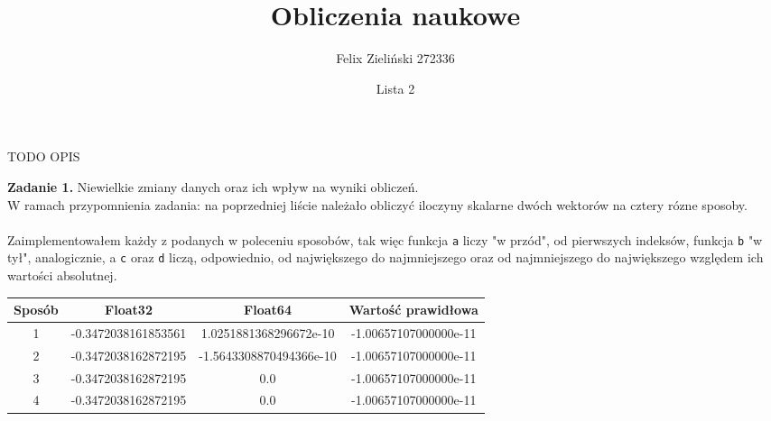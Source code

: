 \documentclass[15pt, a4paper]{article}
\title{Obliczenia naukowe}
\author{Felix Zieliński 272336}
\date{Lista 2}
\begin{document}
\maketitle
TODO OPIS

\vspace{0.5cm}

\noindent\hrulefill


\vspace{0.5cm}

\noindent\textbf{Zadanie 1.} Niewielkie zmiany danych oraz ich wpływ na wyniki obliczeń.\\

\noindent W ramach przypomnienia zadania: na poprzedniej liście  należało obliczyć iloczyny skalarne dwóch wektorów na cztery rózne sposoby.\\\\
Zaimplementowałem każdy z podanych w poleceniu sposobów, tak więc funkcja \verb|a| liczy "w przód", od pierwszych indeksów, funkcja \verb|b| "w tył", analogicznie, a \verb|c| oraz \verb|d| liczą, odpowiednio, od największego do najmniejszego oraz od najmniejszego do największego względem ich wartości absolutnej.

\begin{table}[ht]
    \begin{adjustbox}{max width=\textwidth}
    \begin{tabular}{|c|c|c|c|}
        \hline 
        Sposób & Float32 & Float64 & Wartość prawidłowa \\ \hline
        1 & -0.3472038161853561  & 1.0251881368296672e-10 & -1.00657107000000e-11 \\ \hline
        2 & -0.3472038162872195 & -1.5643308870494366e-10 & -1.00657107000000e-11 \\ \hline
        3 & -0.3472038162872195 & 0.0 & -1.00657107000000e-11  \\ \hline
        4 & -0.3472038162872195 & 0.0 & -1.00657107000000e-11 \\ \hline
    \end{tabular}
    \end{adjustbox}
    \label{tab:products}
\end{table}

\vspace{0.5cm}
\end{document}
